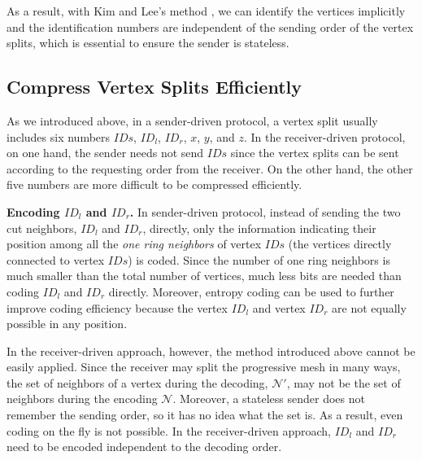    As a result, with Kim and Lee's method \cite{kim01truly}, we can identify the vertices
    implicitly and the identification numbers are independent of the sending order of the 
    vertex splits, which is essential to ensure the sender is stateless.

    \subsection{Compress Vertex Splits Efficiently}
    As we introduced above, in a sender-driven protocol, 
    a vertex split usually includes six numbers $IDs$, $ID_l$, $ID_r$,
    $x$, $y$, and $z$. 
    In the receiver-driven protocol, on one hand, the sender needs not send
    $IDs$ since the vertex splits can be sent according to
    the requesting order from the receiver. On the other hand, the other 
    five numbers are more difficult to be compressed efficiently.
    
    \textbf{Encoding $ID_l$ and $ID_r$.}
    In sender-driven protocol, instead of sending the two cut neighbors, $ID_l$ and $ID_r$, directly,
    only the information indicating their position among all the \emph{one ring neighbors}
    of vertex $IDs$ (the vertices directly connected to vertex $IDs$) is coded.  
    Since the number of one ring neighbors is much smaller than the total number of vertices,
    much less bits are needed than coding $ID_l$ and $ID_r$ directly. Moreover, entropy coding
    can be used to further improve coding efficiency because the vertex $ID_l$ and vertex $ID_r$
    are not equally possible in any position.

    In the receiver-driven approach, however, the method introduced above cannot be easily applied.
    Since the receiver may split the progressive mesh in many ways, the set of neighbors of 
    a vertex during the decoding, $\mathcal{N}'$, 
    may not be the set of neighbors during the encoding $\mathcal{N}$.
    Moreover, a stateless sender does not remember the sending
    order, so it has no idea what the set is. 
    As a result, even coding on the fly is not possible. 
    In the receiver-driven approach, $ID_l$ and $ID_r$ need to be encoded independent to the decoding order. 

